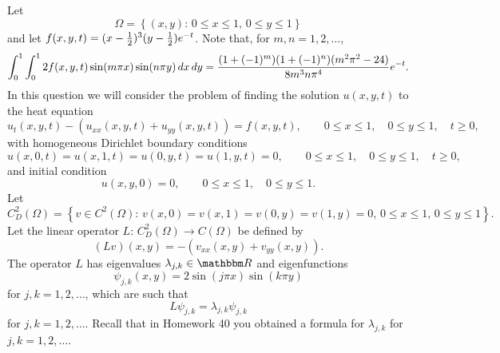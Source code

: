 Let
\[
\Omega=\left\{(x,y):\,0\le x\le 1,\,0\le y\le 1\right\}
\]
and let $f(x,y,t) = (x-{1 \over 2})^3 (y-{1 \over 2}) e^{-t}$. Note that, for $m,n=1,2,\ldots$,
\[
\int_0^1 \int_0^1 2 f(x,y,t) \sin(m \pi x) \sin(n \pi y)\,dx\,dy= {(1+(-1)^m)(1+(-1)^n) (m^2\pi^2-24)\over 8 m^3 n \pi^4} e^{-t}.
\]
In this question we will consider the problem of finding the solution $u(x,y,t)$ to the heat equation
\[ 
u_t(x,y,t)-(u_{xx}(x,y,t) +u_{yy}(x,y,t)) = f(x,y,t), \qquad 0\le x \le 1, \quad 0\le y\le 1, \quad t\ge 0,
\]
with homogeneous Dirichlet boundary conditions
\[
u(x,0,t)=u(x,1,t)=u(0,y,t)=u(1,y,t)=0, \qquad 0\le x \le 1, \quad 0\le y\le 1, \quad t\ge 0,
\]
and initial condition
\[
u(x,y,0) = 0, \qquad 0\le x\le 1, \quad 0\le y\le 1.
\]
Let
\[
C^2_D(\Omega)=\left\{v\in C^2(\Omega):\,v(x,0)=v(x,1)=v(0,y)=v(1,y)=0,\,0\le x\le 1,\,0\le y\le 1\right\}.
\]
Let the linear operator $L:\,C^2_D(\Omega)\rightarrow C(\Omega)$ be defined by
\[
\left(L v\right)(x,y) = -\left(v_{xx}(x,y) + v_{yy}(x,y)\right).
\]
The operator $L$ has eigenvalues $\lambda_{j,k}\in\R$ and eigenfunctions
\[
\psi_{j,k}(x,y) = 2 \sin(j \pi x) \sin(k \pi y)
\]
for $j,k = 1,2,\ldots$, which are such that
\[
L\psi_{j,k}=\lambda_{j,k}\psi_{j,k}
\]
for $j,k = 1,2,\ldots$. Recall that in Homework 40 you obtained a formula for $\lambda_{j,k}$ for $j,k = 1,2,\ldots$.

